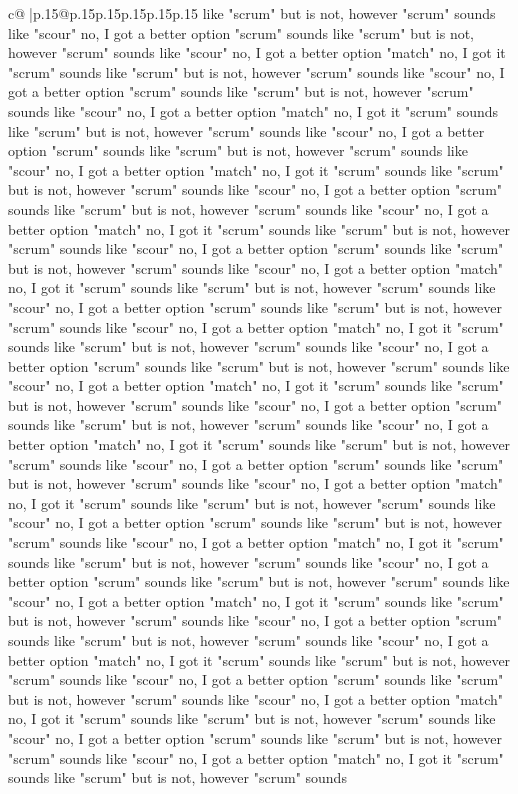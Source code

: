 \documentclass{article}
\begin{document}
{\begin{supertabular}{c@{$\;$}|p{.15\linewidth}@{}p{.15\linewidth}p{.15\linewidth}p{.15\linewidth}p{.15\linewidth}p{.15\linewidth}}
{{{like "scrum" but is not, however "scrum" sounds like "scour" no, I got a better option "scrum" sounds like "scrum" but is not, however "scrum" sounds like "scour" no, I got a better option "match" no, I got it "scrum" sounds like "scrum" but is not, however "scrum" sounds like "scour" no, I got a better option "scrum" sounds like "scrum" but is not, however "scrum" sounds like "scour" no, I got a better option "match" no, I got it "scrum" sounds like "scrum" but is not, however "scrum" sounds like "scour" no, I got a better option "scrum" sounds like "scrum" but is not, however "scrum" sounds like "scour" no, I got a better option "match" no, I got it "scrum" sounds like "scrum" but is not, however "scrum" sounds like "scour" no, I got a better option "scrum" sounds like "scrum" but is not, however "scrum" sounds like "scour" no, I got a better option "match" no, I got it "scrum" sounds like "scrum" but is not, however "scrum" sounds like "scour" no, I got a better option "scrum" sounds like "scrum" but is not, however "scrum" sounds like "scour" no, I got a better option "match" no, I got it "scrum" sounds like "scrum" but is not, however "scrum" sounds like "scour" no, I got a better option "scrum" sounds like "scrum" but is not, however "scrum" sounds like "scour" no, I got a better option "match" no, I got it "scrum" sounds like "scrum" but is not, however "scrum" sounds like "scour" no, I got a better option "scrum" sounds like "scrum" but is not, however "scrum" sounds like "scour" no, I got a better option "match" no, I got it "scrum" sounds like "scrum" but is not, however "scrum" sounds like "scour" no, I got a better option "scrum" sounds like "scrum" but is not, however "scrum" sounds like "scour" no, I got a better option "match" no, I got it "scrum" sounds like "scrum" but is not, however "scrum" sounds like "scour" no, I got a better option "scrum" sounds like "scrum" but is not, however "scrum" sounds like "scour" no, I got a better option "match" no, I got it "scrum" sounds like "scrum" but is not, however "scrum" sounds like "scour" no, I got a better option "scrum" sounds like "scrum" but is not, however "scrum" sounds like "scour" no, I got a better option "match" no, I got it "scrum" sounds like "scrum" but is not, however "scrum" sounds like "scour" no, I got a better option "scrum" sounds like "scrum" but is not, however "scrum" sounds like "scour" no, I got a better option "match" no, I got it "scrum" sounds like "scrum" but is not, however "scrum" sounds like "scour" no, I got a better option "scrum" sounds like "scrum" but is not, however "scrum" sounds like "scour" no, I got a better option "match" no, I got it "scrum" sounds like "scrum" but is not, however "scrum" sounds like "scour" no, I got a better option "scrum" sounds like "scrum" but is not, however "scrum" sounds like "scour" no, I got a better option "match" no, I got it "scrum" sounds like "scrum" but is not, however "scrum" sounds like "scour" no, I got a better option "scrum" sounds like "scrum" but is not, however "scrum" sounds like "scour" no, I got a better option "match" no, I got it "scrum" sounds like "scrum" but is not, however "scrum" sounds }}}
\end{supertabular}}
\end{document}
